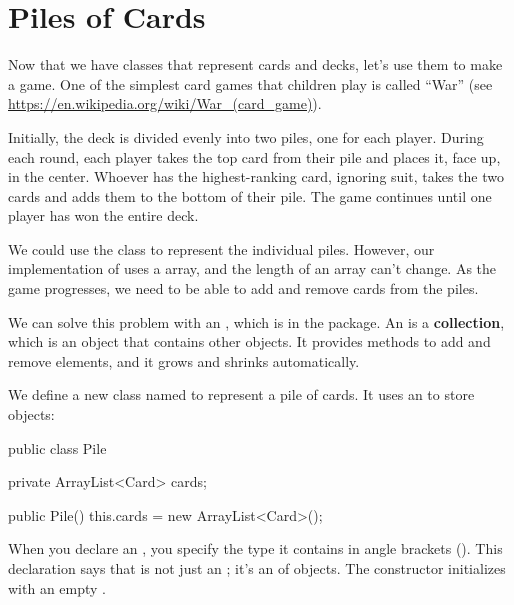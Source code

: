 \section{Piles of Cards}


Now that we have classes that represent cards and decks, let's use them to make a game.
One of the simplest card games that children play is called ``War'' (see \url{https://en.wikipedia.org/wiki/War_(card_game)}).

Initially, the deck is divided evenly into two piles, one for each player.
During each round, each player takes the top card from their pile and places it, face up, in the center.
Whoever has the highest-ranking card, ignoring suit, takes the two cards and adds them to the bottom of their pile.
The game continues until one player has won the entire deck.

We could use the  class to represent the individual piles.
However, our implementation of  uses a  array, and the length of an array can't change.
As the game progresses, we need to be able to add and remove cards from the piles.


We can solve this problem with an , which is in the  package.
An  is a {\bf collection}, which is an object that contains other objects.
It provides methods to add and remove elements, and it grows and shrinks automatically.



We define a new class named  to represent a pile of cards.
It uses an  to store  objects:

\begin{code}
public class Pile {
    private ArrayList<Card> cards;

    public Pile() {
        this.cards = new ArrayList<Card>();
    }
}
\end{code}


When you declare an , you specify the type it contains in angle brackets (\java{<>}).
This declaration says that  is not just an ; it's an  of  objects.
The constructor initializes  with an empty .


